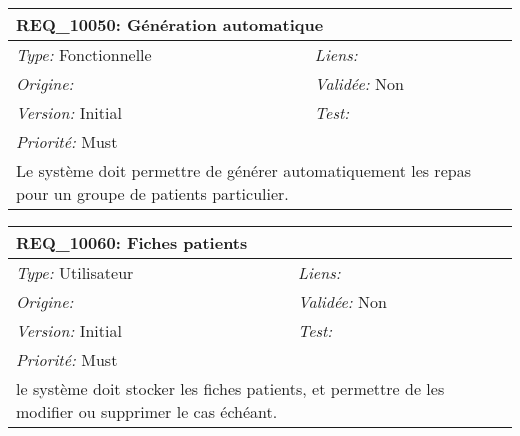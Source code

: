 \begin{table}[!h]

\begin{tabular}{|p{60mm}p{100mm}|}

\hline

\multicolumn{2}{|l|}{\textbf{REQ\_10050:} Génération automatique} \\ \hline

\emph{Type:} Fonctionnelle & \emph{Liens:}  \\

\emph{Origine:}  & \emph{Validée:} Non \\

\emph{Version:} Initial & \emph{Test:}  \\

\emph{Priorité:} Must & \\ \hline

\multicolumn{2}{|p{16cm}|}{Le système doit permettre de générer automatiquement les repas pour un groupe de patients particulier.} \\ \hline

\end{tabular}

\end{table}



\begin{table}[!h]

\begin{tabular}{|p{60mm}p{100mm}|}

\hline

\multicolumn{2}{|l|}{\textbf{REQ\_10060:} Fiches patients} \\ \hline

\emph{Type:} Utilisateur & \emph{Liens:}  \\

\emph{Origine:}  & \emph{Validée:} Non \\

\emph{Version:} Initial & \emph{Test:}  \\

\emph{Priorité:} Must & \\ \hline

\multicolumn{2}{|p{16cm}|}{le système doit stocker les fiches patients, et permettre de les modifier ou supprimer le cas échéant.} \\ \hline

\end{tabular}

\end{table}



